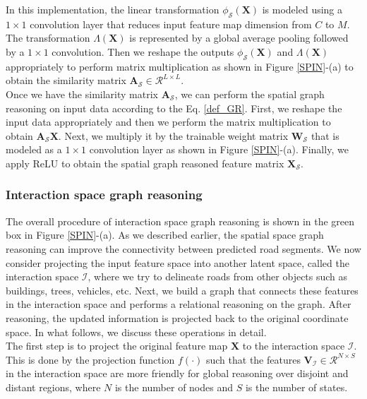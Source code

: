 \documentclass[letterpaper, 10 pt, conference]{ieeeconf}
\begin{document}
In this implementation, the linear transformation $ \phi_{\mathcal{S}}(\boldsymbol{X})$ is modeled using a $1 \times 1$   convolution layer that reduces input feature map dimension from $C$ to $M$. The transformation $\Lambda(\boldsymbol{X})$ is represented by a global average pooling followed by a $1 \times 1$ convolution. Then we reshape the outputs $\phi_{\mathcal{S}}(\boldsymbol{X})$ and $\Lambda(\boldsymbol{X})$ appropriately to perform matrix multiplication as shown in Figure \ref{SPIN}-(a) to obtain the similarity matrix $\boldsymbol{A}_{\mathcal{S}} \in \mathcal{R}^{L \times L}$.\\
 Once we have the similarity matrix $\boldsymbol{A}_{\mathcal{S}}$, we can perform the spatial graph reasoning on input data according to the Eq. \eqref{def_GR}. First, we reshape the input data appropriately and then we perform the matrix multiplication to obtain $\boldsymbol{A}_{\mathcal{S}} \boldsymbol{X}$. Next, we multiply it by the trainable weight matrix $\boldsymbol{W}_{\mathcal{S}}$ that is modeled as a $1 \times 1$ convolution layer as shown in Figure \ref{SPIN}-(a). Finally, we apply ReLU to obtain the spatial graph reasoned feature matrix $\boldsymbol{X}_{\mathcal{S}}$.
\subsubsection{Interaction space graph reasoning}
The overall procedure of interaction space graph reasoning is shown in the green box in Figure \ref{SPIN}-(a). As we described earlier, the spatial space graph reasoning can improve the connectivity between predicted road segments. We now consider projecting the input feature space into another latent space, called the interaction space $ \mathcal{I} $, where we try to delineate roads from other objects such as buildings, trees, vehicles, etc. Next, we build a graph that connects these features in the interaction space and performs a relational reasoning on the graph. After reasoning, the updated information is projected back to the original coordinate space. In what follows, we discuss these operations in detail.\\
  The first step is to project the original feature map $\boldsymbol{X}$ to the interaction space $\mathcal{I}$. This is done by the projection function $f(\cdot)$ such that the features $\boldsymbol{V}_{\mathcal{I}} \in \mathcal{R}^{N \times S}$ in the interaction space are more friendly for global reasoning over disjoint and distant regions, where $N$ is the number of nodes and $S$ is the number of states.
\end{document}
